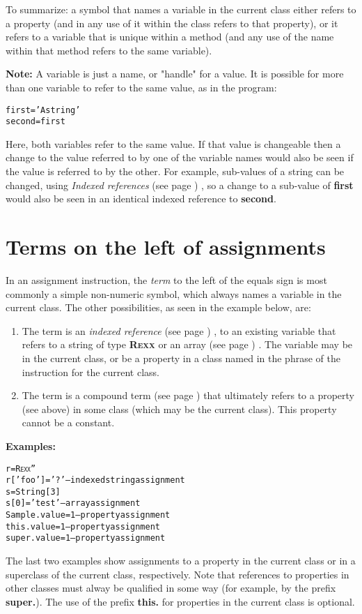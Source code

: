 To summarize: a symbol that names a variable in the current class either
refers to a property (and in any use of it within the class refers to
that property), or it refers to a variable that is unique within a
method (and any use of the name within that method refers to the same
variable).
\begin{shaded}
\textbf{Note: }
A variable is just a name, or "handle" for a value.
It is possible for more than one variable to refer to the same value, as
in the program:
\begin{alltt}
first='A string'
second=first
\end{alltt}
Here, both variables refer to the same value.  If that value is
changeable then a change to the value referred to by one of the
variable names would also be seen if the value is referred to by the
other.
For example, sub-values of a \nr{} string can be changed, using
 \emph{Indexed references} (see page \pageref{refinstr}) , so a change to a
sub-value of \textbf{first} would also be seen in an identical indexed
reference to \textbf{second}.
\end{shaded}
\section{Terms on the left of assignments}
 
In an assignment instruction, the \emph{term} to the left of the
equals sign is most commonly a simple non-numeric symbol, which
always names a variable in the current class.
The other possibilities, as seen in the example below, are:
\begin{enumerate}
\item 
The term is an  \emph{indexed reference} (see page \pageref{refinstr}) , to an
existing variable that refers to a string of type \textbf{R\textsc{exx}} or an
 array (see page \pageref{refarray}) .
The variable may be in the current class, or be a property in a class
named in the  phrase of the  instruction for
the current class.
\item 
The term is a  compound term (see page \pageref{refcomterm})  that ultimately refers
to a property (see above) in some class (which may be the current class).
This property cannot be a constant.
\end{enumerate}
 \textbf{Examples:}
\begin{alltt}
r=R\textsc{exx} ''
r['foo']='?'         -- indexed string assignment
s=String[3]
s[0]='test'          -- array assignment
Sample.value=1       -- property assignment
this.value=1         -- property assignment
super.value=1        -- property assignment
\end{alltt}

The last two examples show assignments to a property in the current
class or in a superclass of the current class, respectively.  Note that
references to properties in other classes must alway be qualified in
some way (for example, by the prefix \textbf{super.}).  The use of the
prefix \textbf{this.} for properties in the current class is optional.

